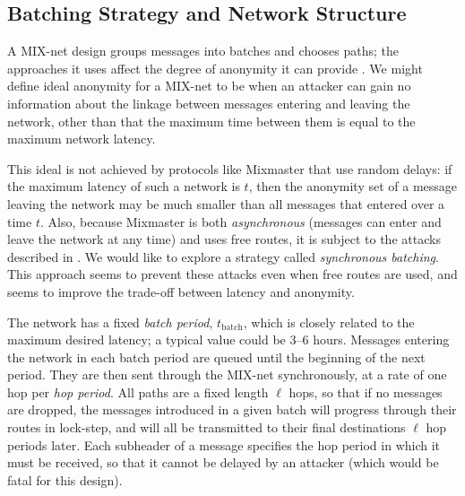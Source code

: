 \documentclass[11pt]{IEEEtran}
\begin{document}
\subsection{Batching Strategy and Network Structure}
\label{subsec:batching}


A MIX-net design groups messages into batches and chooses paths; the
approaches it uses affect the degree of anonymity it can provide
\cite{batching-taxonomy}.
We might define ideal anonymity for a MIX-net to be when an attacker can
gain no information about the linkage between messages entering and
leaving the network, other than that the maximum time between them is
equal to the maximum network latency.


This ideal is not achieved by protocols like Mixmaster that use random
delays: if the maximum latency of such a network is $t$, then the
anonymity set of a message leaving the network may be much smaller
than all messages that entered over a time $t$.
Also, because Mixmaster is both {\em asynchronous} (messages can enter and
leave the network at any time) and uses free routes, it is subject to
the attacks described in \cite{disad-free-routes}.
We would like to explore a
strategy called {\em synchronous batching}. This approach seems to prevent
these attacks even when free routes are used, and seems to improve the
trade-off between latency and anonymity.

The network has a fixed {\em batch period}, $t_\mathrm{batch}$, which is closely
related to the maximum desired latency; a typical value could be 3--6 hours.
Messages entering the network in each batch period are queued until
the beginning of the next period. They are then sent through the MIX-net
synchronously, at a rate of one hop per {\em hop period}. All paths are
a fixed length $\ell$ hops, so that if no messages are dropped, the messages
introduced in a given batch will progress through their routes in
lock-step, and will all be transmitted to their final destinations $\ell$
hop periods later. Each subheader of a message specifies the hop
period in which it must be received, so that it cannot be delayed by an
attacker (which would be fatal for this design).
\end{document}
